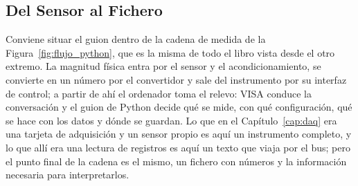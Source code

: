 \subsection{Del Sensor al Fichero}\label{sub:flujo_python}

Conviene situar el guion dentro de la cadena de medida de la Figura~\ref{fig:flujo_python}, que es la misma de todo el libro vista desde el otro extremo. La magnitud física entra por el sensor y el acondicionamiento, se convierte en un número por el convertidor y sale del instrumento por su interfaz de control; a partir de ahí el ordenador toma el relevo: VISA conduce la conversación y el guion de Python decide qué se mide, con qué configuración, qué se hace con los datos y dónde se guardan. Lo que en el Capítulo~\ref{cap:daq} era una tarjeta de adquisición y un sensor propio es aquí un instrumento completo, y lo que allí era una lectura de registros es aquí un texto que viaja por el bus; pero el punto final de la cadena es el mismo, un fichero con números y la información necesaria para interpretarlos.

